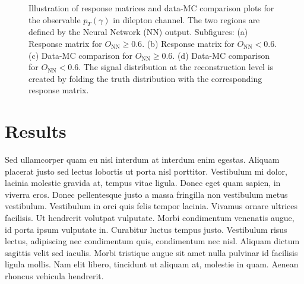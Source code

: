 \begin{figure}[ht]
    \quad\quad
    \caption{Illustration of response matrices and data-MC comparison plots for
    the observable $p_T(\gamma)$ in dilepton channel. The two regions are
    defined by the Neural Network (NN) output. Subfigures: (a) Response matrix
    for $O_{\mathrm{NN}} \geq 0.6$. (b) Response matrix for $O_{\mathrm{NN}} <
    0.6$. (c) Data-MC comparison for $O_{\mathrm{NN}} \geq 0.6$. (d) Data-MC
    comparison for $O_{\mathrm{NN}} < 0.6$. The signal distribution at the
    reconstruction level is created by folding the truth distribution with the
    corresponding response matrix.}
    \label{fig:folding_input_response_dilep}
\end{figure}
\FloatBarrier


\section{Results}

Sed ullamcorper quam eu nisl interdum at interdum enim egestas. Aliquam placerat justo sed lectus lobortis ut porta nisl porttitor. Vestibulum mi dolor, lacinia molestie gravida at, tempus vitae ligula. Donec eget quam sapien, in viverra eros. Donec pellentesque justo a massa fringilla non vestibulum metus vestibulum. Vestibulum in orci quis felis tempor lacinia. Vivamus ornare ultrices facilisis. Ut hendrerit volutpat vulputate. Morbi condimentum venenatis augue, id porta ipsum vulputate in. Curabitur luctus tempus justo. Vestibulum risus lectus, adipiscing nec condimentum quis, condimentum nec nisl. Aliquam dictum sagittis velit sed iaculis. Morbi tristique augue sit amet nulla pulvinar id facilisis ligula mollis. Nam elit libero, tincidunt ut aliquam at, molestie in quam. Aenean rhoncus vehicula hendrerit.



